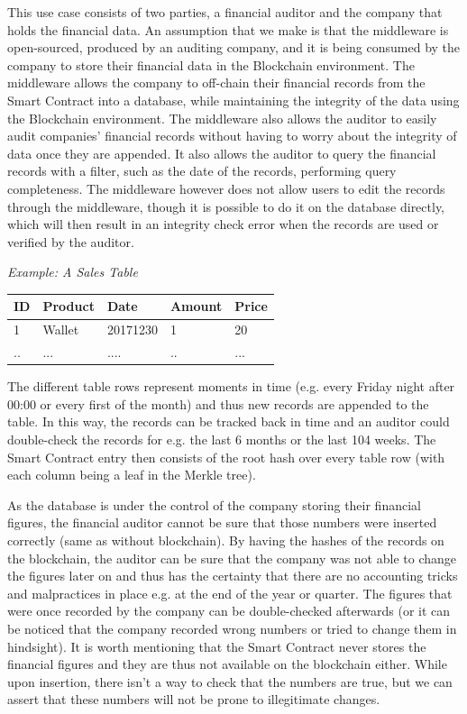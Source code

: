 This use case consists of two parties, a financial auditor and the company that holds the financial data. An assumption that we make is that the middleware is open-sourced, produced by an auditing company, and it is being consumed by the company to store their financial data in the Blockchain environment. The middleware allows the company to off-chain their financial records from the Smart Contract into a database, while maintaining the integrity of the data using the Blockchain environment. The middleware also allows the auditor to easily audit companies’ financial records without having to worry about the integrity of data once they are appended. It also allows the auditor to query the financial records with a filter, such as the date of the records, performing query completeness. The middleware however does not allow users to edit the records through the middleware, though it is possible to do it on the database directly, which will then result in an integrity check error when the records are used or verified by the auditor. 

\textit{Example: A Sales Table}
\begin{center}
    \begin{tabular}{| l | l | l | l | l |}
    \hline
    ID & Product & Date & Amount & Price \\ \hline
    1 & Wallet & 20171230 & 1 & 20 \\ \hline
    .. & ... & .... & .. & ... \\ \hline
    \end{tabular}
\end{center}

The different table rows represent moments in time (e.g. every Friday night after 00:00 or every first of the month) and thus new records are appended to the table. In this way, the records can be tracked back in time and an auditor could double-check the records for e.g. the last 6 months or the last 104 weeks. The Smart Contract entry then consists of the root hash over every table row (with each column being a leaf in the Merkle tree).

As the database is under the control of the company storing their financial figures, the financial auditor cannot be sure that those numbers were inserted correctly (same as without blockchain). By having the hashes of the records on the blockchain, the auditor can be sure that the company was not able to change the figures later on and thus has the certainty that there are no accounting tricks and malpractices in place e.g. at the end of the year or quarter. The figures that were once recorded by the company can be double-checked afterwards (or it can be noticed that the company recorded wrong numbers or tried to change them in hindsight). It is worth mentioning that the Smart Contract never stores the financial figures and they are thus not available on the blockchain either. While upon insertion, there isn’t a way to check that the numbers are true, but we can assert that these numbers will not be prone to illegitimate changes. 

